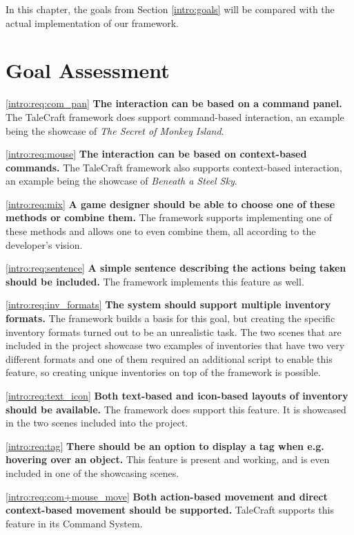 In this chapter, the goals from Section \ref{intro:goals} will be compared with the actual implementation of our framework.


\section{Goal Assessment}

\hspace{0.5 cm} \ref{intro:req:com_pan} \quad \textbf{The interaction can be based on a command panel.} The TaleCraft framework does support command-based interaction, an example being the showcase of \textit{The Secret of Monkey Island}.

\ref{intro:req:mouse} \quad  \textbf{The interaction can be based on context-based commands. } The TaleCraft framework also supports context-based interaction, an example being the showcase of \textit{Beneath a Steel Sky}.

\ref{intro:req:mix} \quad  \textbf{A game designer should be able to choose one of these methods or combine them.} The framework supports implementing one of these methods and allows one to even combine them, all according to the developer's vision.

\ref{intro:req:sentence} \quad  \textbf{A simple sentence describing the actions being taken should be included.} The framework implements this feature as well.

\ref{intro:req:inv_formats} \quad  \textbf{The system should support multiple inventory formats.} The framework builds a basis for this goal, but creating the specific inventory formats turned out to be an unrealistic task. The two scenes that are included in the project showcase two examples of inventories that have two very different formats and one of them required an additional script to enable this feature, so creating unique inventories on top of the framework is possible.

\ref{intro:req:text_icon} \quad  \textbf{Both text-based and icon-based layouts of inventory should be available.} The framework does support this feature. It is showcased in the two scenes included into the project.

\ref{intro:req:tag} \quad  \textbf{There should be an option to display a tag when e.g. hovering over an object.} This feature is present and working, and is even included in one of the showcasing scenes.

\ref{intro:req:com+mouse_move} \quad  \textbf{Both action-based movement and direct context-based movement should be supported.} TaleCraft supports this feature in its Command System.

